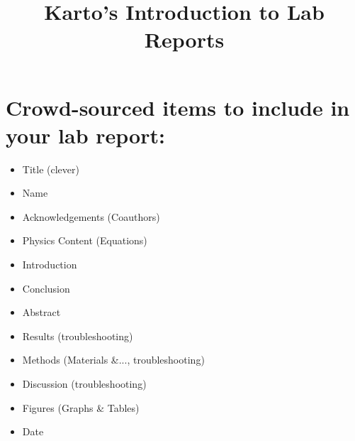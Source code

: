 \documentclass[12pt]{article}
\begin{document}
\title{Karto's Introduction to Lab Reports}
\maketitle

\section*{Crowd-sourced items to include in your lab report:}
\begin{itemize}
  \item{Title (clever)}
  \item{Name}
  \item{Acknowledgements (Coauthors)}
  \item{Physics Content (Equations)}
  \item{Introduction}
  \item{Conclusion}
  \item{Abstract}
  \item{Results (troubleshooting)}
  \item{Methods (Materials \&..., troubleshooting)}
  \item{Discussion (troubleshooting)}
  \item{Figures (Graphs \& Tables)}
  \item{Date}
\end{itemize}
\end{document}
